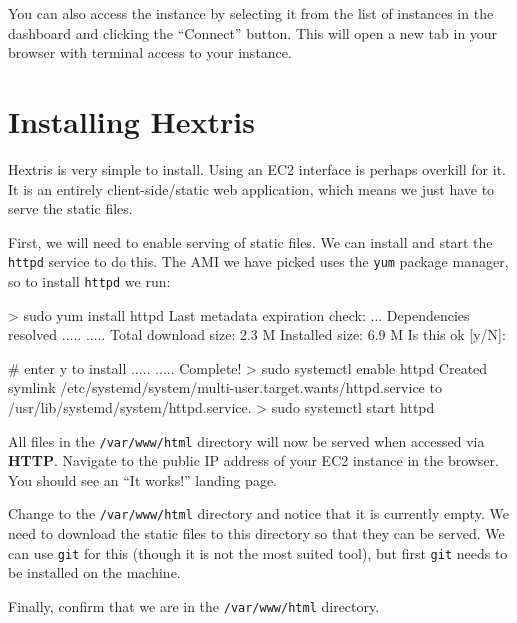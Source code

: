 \documentclass{csse4400}
\begin{document}
\vspace{5mm}
\noindent
You can also access the instance by selecting it from the list of instances in the dashboard and clicking the ``Connect'' button.
This will open a new tab in your browser with terminal access to your instance.


\section{Installing Hextris}\label{sec:installHextris}
Hextris \cite{hextris} is very simple to install. Using an EC2 interface is perhaps overkill for it.
It is an entirely client-side/static web application, which means we just have to serve the static files.

First, we will need to enable serving of static files.
We can install and start the \texttt{httpd} service to do this.
The AMI we have picked uses the \texttt{yum} package manager, so to install \texttt{httpd} we run:

\begin{code}[language=bash,numbers=none]{}
> sudo yum install httpd
Last metadata expiration check: ...
Dependencies resolved
..... 
..... 
Total download size: 2.3 M
Installed size: 6.9 M
Is this ok [y/N]:

# enter y to install
..... 
..... 
Complete!
> sudo systemctl enable httpd
Created symlink /etc/systemd/system/multi-user.target.wants/httpd.service to /usr/lib/systemd/system/httpd.service.
> sudo systemctl start httpd
\end{code}

All files in the \texttt{/var/www/html} directory will now be served when accessed via \textbf{HTTP}.
Navigate to the public IP address of your EC2 instance in the browser.
You should see an ``It works!'' landing page.

Change to the \texttt{/var/www/html} directory and notice that it is currently empty.
We need to download the static files to this directory so that they can be served.
We can use \texttt{git} for this (though it is not the most suited tool),
but first \texttt{git} needs to be installed on the machine.


Finally, confirm that we are in the \texttt{/var/www/html} directory.


\end{document}
